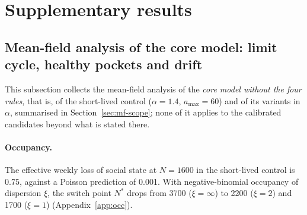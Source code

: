 \section{Supplementary results}
\label{app:results}

\subsection{Mean-field analysis of the core model: limit cycle, healthy pockets and drift}
\label{app:mf-supp}

This subsection collects the mean-field analysis of the \emph{core model without the four rules}, that is, of the
short-lived control ($\alpha=1.4$, $a_{\max}=60$) and of its variants in $\alpha$, summarised in
Section~\ref{sec:mf-scope}; none of it applies to the calibrated candidates beyond what is stated there.

\paragraph{Occupancy.}
The effective weekly loss of social state at $N=1600$ in the short-lived control is 0.75, against a Poisson prediction of
0.001. With negative-binomial occupancy of dispersion $\xi$, the switch point $N^*$ drops from 3700 ($\xi=\infty$)
to 2200 ($\xi=2$) and 1700 ($\xi=1$) (Appendix~\ref{app:occ}).

